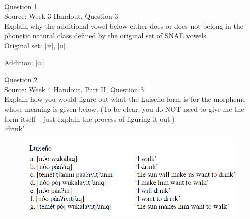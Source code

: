 \documentclass[12pt]{article}
\begin{document}
\newpage

\begin{center}
\textbf{{\color{red}{\HUGE END OF EXAM}}}\\

\end{center}
\newpage

\begin{center}
\textbf{{\color{blue}{\HUGE START OF EXAM\\}}}

\textbf{{\color{blue}{\HUGE Student ID: 74654\\}}}

\textbf{{\color{blue}{\HUGE 4:40\\}}}

\end{center}
\newpage

{\large Question 1}\\

Source: Week 3 Handout, Question 3\\

Explain why the additional vowel below either does or does not belong in the phonetic natural class defined by the original set of SNAE vowels.\\

Original set: {[æ]}, {[ɑ]}

Addition: {[ɑɪ]}


\newpage

{\large Question 2}\\

Source: Week 4 Handout, Part II, Question 3\\

Explain how you would figure out what the Luiseño form is for the morpheme whose meaning is given below. (To be clear: you do NOT need to give me the form itself -- just explain the process of figuring it out.)\\

‘drink’

\begin{figure}[H]
\includegraphics{../images/luiseno.png}
\end{figure}
\end{document}
